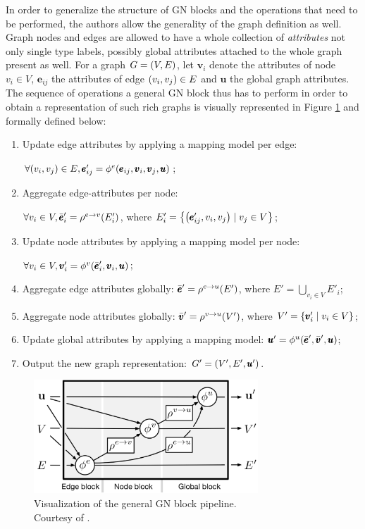 In order to generalize the structure of GN blocks and the operations that need to be performed, the authors allow the generality of the graph definition as well. Graph nodes and edges are allowed to have a whole collection of \emph{attributes} not only single type labels, possibly global attributes attached to the whole graph present as well. For a graph $G=\mathopen{}\left(V, E\right)$, let $\pmb{v}_i$ denote the attributes of node $v_i \in V$, $\pmb{e}_{ij}$ the attributes of edge $\mathopen{}\left(v_i,v_j\right)\in E$ and $\pmb{u}$ the global graph attributes. The sequence of operations a general GN block thus has to perform in order to obtain a representation of such rich graphs is visually represented in Figure \ref{fig:general_gn_block} and formally defined below:
\begin{enumerate}
\item Update edge attributes by applying a mapping model per edge: 

$\forall \mathopen{}\left(v_i, v_j\right) \in E, \pmb{e}'_{ij} = \phi^e\mathopen{}\left(\pmb{e}_{ij},\pmb{v}_i,\pmb{v}_j,\pmb{u}\right)$;
\item Aggregate edge-attributes per node: 

$\forall v_i \in V,\bar{\pmb{e}}'_i = \rho^{e \to v}\mathopen{}\left(E'_i\right)$, where $E'_i = \mathopen{}\left\{\mathopen{}\left(\pmb{e}'_{ij}, v_i, v_j\right) \mid v_j \in V\right\}$;
\item Update node attributes by applying a mapping model per node: 

$\forall v_i \in V, \pmb{v}'_i = \phi^v\mathopen{}\left(\bar{\pmb{e}}'_i, \pmb{v}_i, \pmb{u}\right)$;
\item Aggregate edge attributes globally: $\bar{\pmb{e}}'=\rho^{e \to u}\mathopen{}\left(E'\right)$, where $E' = \bigcup_{v_i \in V}{E'_i}$;
\item Aggregate node attributes globally: $\bar{\pmb{v}}'=\rho^{v \to u}\mathopen{}\left(V'\right)$, where $V' = \mathopen{}\left\{\pmb{v}'_i \mid v_i \in V\right\}$;
\item Update global attributes by applying a mapping model: $\pmb{u}'=\phi^u\mathopen{}\left(\bar{\pmb{e}}', \bar{\pmb{v}}', \pmb{u}\right)$;
\item Output the new graph representation: $G'=\mathopen{}\left(V', E', \pmb{u}'\right)$.
\end{enumerate}

\begin{figure}[H]
\centering
\includegraphics[width=0.75\textwidth]{figures/background/general_gn_block}
\caption[Visualization of the general GN block pipeline.]{Visualization of the general GN block pipeline. \\Courtesy of \cite{battaglia_relational_2018}.}
\label{fig:general_gn_block}
\end{figure}

